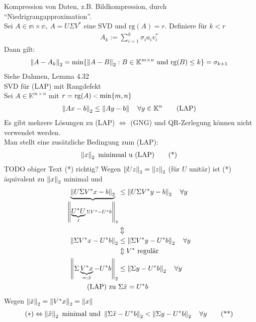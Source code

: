 Kompression von Daten, z.B. Bildkompression, durch ``Niedrigrangapproximation''.\\
\satz Sei $A \in \mathbb{m \times n},\, A = U \Sigma V^*$ eine SVD und $\mathrm{rg}(A) = r$.
Definiere für $k < r$
\begin{align*}
  A_k := \sum^{k}_{i=1} \sigma_i a_i v_i^*
\end{align*}
Dann gilt:
\begin{align*}
  \left\lVert A - A_k \right\rVert_2 = \min \{ \left\lVert A - B \right\rVert_2: B \in \mathbb{K}^{m \times n} \text{ und } \mathrm{rg}(B) \leq k \} = \sigma_{k+1}
\end{align*}
\beweis Siehe Dahmen, Lemma 4.32\\

SVD für (LAP) mit Rangdefekt\\
Sei $A \in \mathbb{K}^{m \times n}$ mit $r = \mathrm{rg}(A) \mathbin{\textcolor{rot}{<}} \min \{m,n\}$
\begin{align*}
  \left\lVert Ax - b \right\rVert_2 \leq \left\lVert Ay - b \right\rVert \quad \forall y \in \mathbb{K}^n \tag{LAP}
\end{align*}
Es gibt mehrere Lösungen zu (LAP) $\Leftrightarrow$ (GNG) und QR-Zerlegung können nicht verwendet werden.\\
Man stellt eine zusätzliche Bedingung zum (LAP):
\begin{align*}
  \left\lVert x \right\rVert_2 \text{ minimual u (LAP)} \tag{*}
\end{align*}
TODO obiger Text (*) richtig?
Wegen $\left\lVert Uz \right\rVert_2 = \left\lVert z \right\rVert_2$ (für $U$ unitär) ist (*) äquivalent zu $\left\lVert x \right\rVert_2$ minimal und
\begin{align*}
  \underbrace{\left\lVert U \Sigma  V^* x - b \right\rVert_2}_{\left\lVert \underbrace{U^*U}_I \Sigma V^* - U^* b \right\rVert_2} &\leq \left\lVert U \Sigma V^* y - b \right\rVert_2 \quad \forall y\\
  &\Updownarrow\\
  \left\lVert \Sigma V^* x - U^*b \right\rVert_2 &\leq \left\lVert \Sigma V^* y - U^* b \right\rVert_2 \quad \forall y\\
  &\Updownarrow V^* \text{ regulär}\\
  \left\lVert \Sigma \underbrace{V^*x}_{=: \tilde{x}} - U^*b \right\rVert_2 &\leq \left\lVert \Sigma y - U^*b \right\rVert_2 \quad \forall y \\
  \text{(LAP) zu } &\Sigma \tilde{x} = U^*b
\end{align*}
Wegen $\left\lVert \tilde{x} \right\rVert_2 = \left\lVert V^* x \right\rVert_2 = \left\lVert x \right\rVert$
\begin{align*}
  (*) \Leftrightarrow \left\lVert \tilde{x} \right\rVert_2 \text{ minimal und } \left\lVert \Sigma \tilde{x} - U^* b \right\rVert_2 < \left\lVert \Sigma y - U^*b \right\rVert_2 \quad \forall y \tag{**}
\end{align*}
